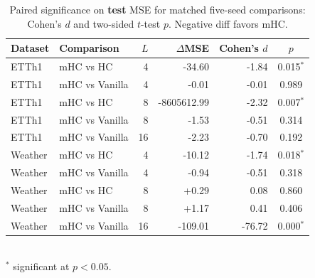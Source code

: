 \begin{table}[t]
\centering
\caption{Paired significance on \textbf{test} MSE for matched five-seed comparisons: Cohen's $d$ and two-sided $t$-test $p$. Negative diff favors mHC.}
\label{tab:sig}
\footnotesize
\begin{tabular}{llrrrc}
\toprule
Dataset & Comparison & $L$ & $\Delta$MSE & Cohen's $d$ & $p$ \\
\midrule
ETTh1 & mHC vs HC & 4 & -34.60 & -1.84 & 0.015$^{*}$ \\
ETTh1 & mHC vs Vanilla & 4 & -0.01 & -0.01 & 0.989 \\
ETTh1 & mHC vs HC & 8 & -8605612.99 & -2.32 & 0.007$^{*}$ \\
ETTh1 & mHC vs Vanilla & 8 & -1.53 & -0.51 & 0.314 \\
ETTh1 & mHC vs Vanilla & 16 & -2.23 & -0.70 & 0.192 \\
Weather & mHC vs HC & 4 & -10.12 & -1.74 & 0.018$^{*}$ \\
Weather & mHC vs Vanilla & 4 & -0.94 & -0.51 & 0.318 \\
Weather & mHC vs HC & 8 & +0.29 & 0.08 & 0.860 \\
Weather & mHC vs Vanilla & 8 & +1.17 & 0.41 & 0.406 \\
Weather & mHC vs Vanilla & 16 & -109.01 & -76.72 & 0.000$^{*}$ \\
\bottomrule
\end{tabular}
\\[2pt]
\footnotesize $^{*}$ significant at $p<0.05$.
\end{table}
